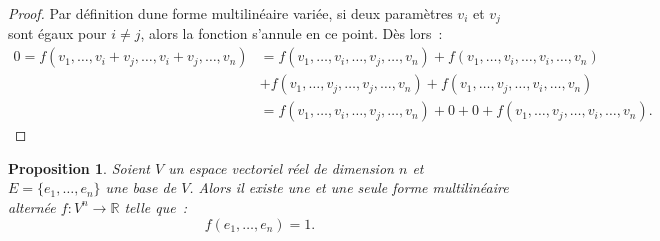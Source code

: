 \documentclass{article}
\newcommand{\R}{\mathbb R}
\newtheorem{prp}[thm]{Proposition}
\theoremstyle{definition}
\theoremstyle{remark}
\begin{document}
		\begin{proof} Par définition dune forme multilinéaire variée, si deux paramètres $v_i$ et $v_j$ sont égaux pour $i \neq j$, alors
		la fonction s'annule en ce point. Dès lors~:
		\[\begin{aligned}
			0 = f(v_1, \ldots, v_i+v_j, \ldots, v_i+v_j, \ldots, v_n) &= f(v_1, \ldots, v_i, \ldots, v_j, \ldots, v_n) + f(v_1, \ldots, v_i, \ldots, v_i, \ldots, v_n) \\
			                                                          &+ f(v_1, \ldots, v_j, \ldots, v_j, \ldots, v_n) + f(v_1, \ldots, v_j, \ldots, v_i, \ldots, v_n) \\
																	  &= f(v_1, \ldots, v_i, \ldots, v_j, \ldots, v_n) + 0 + 0 + f(v_1, \ldots, v_j, \ldots, v_i, \ldots, v_n).
		\end{aligned}\] \end{proof}

		\begin{prp} Soient $V$ un espace vectoriel réel de dimension $n$ et $E = \{e_1, \ldots, e_n\}$ une base de $V$. Alors il existe une et une seule forme
		multilinéaire alternée $f : V^n \to \R$ telle que~:
		\[f(e_1, \ldots, e_n) = 1.\] \end{prp}
\end{document}
